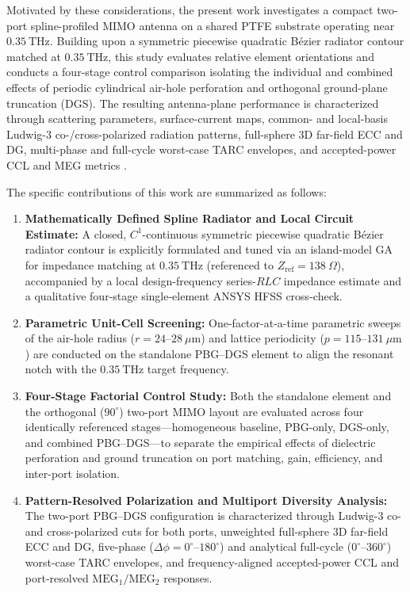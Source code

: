 \documentclass[referee,pdflatex,sn-mathphys-ay]{sn-jnl}
\begin{document}
Motivated by these considerations, the present work investigates a compact two-port spline-profiled MIMO antenna on a shared PTFE substrate operating near \(0.35~\mathrm{THz}\). Building upon a symmetric piecewise quadratic B\'ezier radiator contour matched at \(0.35~\mathrm{THz}\), this study evaluates relative element orientations and conducts a four-stage control comparison isolating the individual and combined effects of periodic cylindrical air-hole perforation and orthogonal ground-plane truncation (DGS). The resulting antenna-plane performance is characterized through scattering parameters, surface-current maps, common- and local-basis Ludwig-3 co-/cross-polarized radiation patterns, full-sphere 3D far-field ECC and DG, multi-phase and full-cycle worst-case TARC envelopes, and accepted-power CCL and MEG metrics \citep{azzouz2025,babu2021,nirob2025,singh2022,fritzandrade2022}.

The specific contributions of this work are summarized as follows:
\begin{enumerate}
    \item \textbf{Mathematically Defined Spline Radiator and Local Circuit Estimate:} A closed, \(C^{1}\)-continuous symmetric piecewise quadratic B\'ezier radiator contour is explicitly formulated and tuned via an island-model GA for impedance matching at \(0.35~\mathrm{THz}\) (referenced to \(Z_{\mathrm{ref}} = 138~\Omega\)), accompanied by a local design-frequency series-\(RLC\) impedance estimate and a qualitative four-stage single-element ANSYS HFSS cross-check.
    \item \textbf{Parametric Unit-Cell Screening:} One-factor-at-a-time parametric sweeps of the air-hole radius (\(r = 24\)--\(28~\mu\mathrm{m}\)) and lattice periodicity (\(p = 115\)--\(131~\mu\mathrm{m}\)) are conducted on the standalone PBG--DGS element to align the resonant notch with the \(0.35~\mathrm{THz}\) target frequency.
    \item \textbf{Four-Stage Factorial Control Study:} Both the standalone element and the orthogonal (\(90^{\circ}\)) two-port MIMO layout are evaluated across four identically referenced stages---homogeneous baseline, PBG-only, DGS-only, and combined PBG--DGS---to separate the empirical effects of dielectric perforation and ground truncation on port matching, gain, efficiency, and inter-port isolation.
    \item \textbf{Pattern-Resolved Polarization and Multiport Diversity Analysis:} The two-port PBG--DGS configuration is characterized through Ludwig-3 co- and cross-polarized cuts for both ports, unweighted full-sphere 3D far-field ECC and DG, five-phase (\(\Delta\phi = 0^{\circ}\)--\(180^{\circ}\)) and analytical full-cycle (\(0^{\circ}\)--\(360^{\circ}\)) worst-case TARC envelopes, and frequency-aligned accepted-power CCL and port-resolved \(\mathrm{MEG}_1/\mathrm{MEG}_2\) responses.
\end{enumerate}
\end{document}
